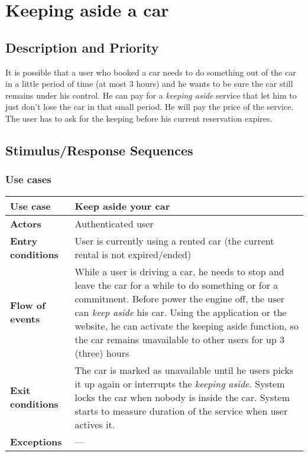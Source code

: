\documentclass{scrreprt}
\begin{document}
\section{Keeping aside a car}
\subsection{Description and Priority}
It is possible that a user who booked a car needs to do something out of the car in a little period of time (at most 3 hours) and he wants to be sure the car still remains under his control. He can pay for a \emph{keeping aside} service that let him to just don't lose the car in that small period. He will pay the price of the service. The user has to ask for the keeping before his current reservation expires.
 
\subsection{Stimulus/Response Sequences}
\subsubsection{Use cases}

\begin{center}
\begin{tabularx}{\columnwidth}{>{\bfseries}lX}
\toprule
Use case & Keep aside your car\\
\midrule
Actors & Authenticated user\\
\midrule
Entry conditions & User is currently using a rented car (the current rental is not expired/ended)\\
\midrule
Flow of events & While a user is driving a car, he needs to stop and leave the car for a while to do something or for a commitment. Before power the engine off, the user can \emph{keep aside} his car. Using the application or the website, he can activate the keeping aside function, so the car remains unavailable to other users for up 3 (three) hours\\
\midrule
Exit conditions & The car is marked as unavailable until he users picks it up again or interrupts the \emph{keeping aside}. System locks the car when nobody is inside the car. System starts to measure duration of the service when user actives it.\\
\midrule
Exceptions & ---\\
\bottomrule
\end{tabularx}
\end{center}
\end{document}

